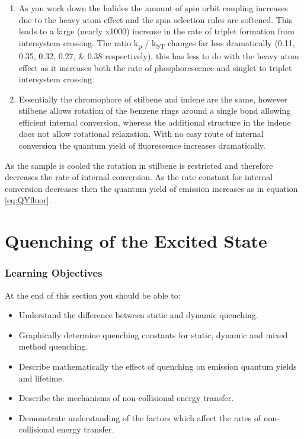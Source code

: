 \documentclass[
]{book}
\providecommand{\tightlist}{%
  \setlength{\itemsep}{0pt}\setlength{\parskip}{0pt}}
\begin{document}
\begin{enumerate}
\def\labelenumi{\arabic{enumi}.}
\setcounter{enumi}{5}
\item
  As you work down the halides the amount of spin orbit coupling increases due to the heavy atom effect and the spin selection rules are softened. This leads to a large (nearly x1000) increase in the rate of triplet formation from intersystem crossing. The ratio k\textsubscript{p} / k\textsubscript{ST} changes far less dramatically (0.11, 0.35, 0.32, 0.27, \& 0.38 respectively), this has less to do with the heavy atom effect as it increases both the rate of phosphorescence and singlet to triplet intersystem crossing.
\item
  Essentially the chromophore of stilbene and indene are the same, however stilbene allows rotation of the benzene rings around a single bond allowing efficient internal conversion, whereas the additional structure in the indene does not allow rotational relaxation. With no easy route of internal conversion the quantum yield of fluorescence increases dramatically.
\end{enumerate}

As the sample is cooled the rotation in stilbene is restricted and therefore decreases the rate of internal conversion. As the rate constant for internal conversion decreases then the quantum yield of emission increases as in equation \eqref{eq:QYfluor}.

\hypertarget{chQuench}{%
\chapter{Quenching of the Excited State}\label{chQuench}}

\hypertarget{sec:QuenchLOs}{%
\subsection{Learning Objectives}\label{sec:QuenchLOs}}

At the end of this section you should be able to:

\begin{itemize}
\tightlist
\item
  Understand the difference between static and dynamic quenching.
\item
  Graphically determine quenching constants for static, dynamic and mixed method quenching.
\item
  Describe mathematically the effect of quenching on emission quantum yields and lifetime.
\item
  Describe the mechanisms of non-collisional energy transfer.
\item
  Demonstrate understanding of the factors which affect the rates of non-collisional energy transfer.
\end{itemize}
\end{document}
